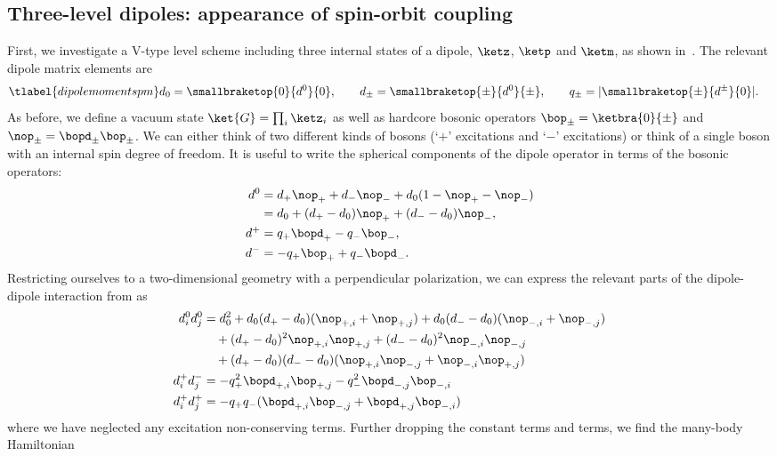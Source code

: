 \subsection{Three-level dipoles: appearance of spin-orbit coupling}
First, we investigate a \textsf{V}-type level scheme including three internal states of a dipole, $\ketz$, $\ketp$ and $\ketm$, as shown in~. The relevant dipole matrix elements are
\begin{align} \tlabel{dipolemomentspm}
    d_0 = \smallbraketop{0}{d^0}{0}, \qquad
    d_\pm = \smallbraketop{\pm}{d^0}{\pm}, \qquad
    q_\pm &= |\smallbraketop{\pm}{d^\pm}{0}|.
\end{align}
As before, we define a vacuum state $\ket{G}=\prod_i \ketz_i$ as well as hardcore bosonic operators $\bop_\pm=\ketbra{0}{{\pm}}$ and $\nop_{\pm}=\bopd_{\pm}\bop_{\pm}$. We can either think of two different kinds of bosons (`$+$' excitations and `$-$' excitations) or think of a single boson with an internal spin degree of freedom. It is useful to write the spherical components of the dipole operator in terms of the bosonic operators:
\begin{align}
    d^0 &= d_+ \nop_+ + d_- \nop_- + d_0 (1-\nop_+-\nop_-) \\
        &= d_0 + (d_+-d_0) \nop_+ + (d_--d_0) \nop_-, \\
    d^+ &= q_+ \bopd_+ - q_- \bop_-, \\
    d^- &= - q_+ \bop_+  + q_- \bopd_-.
\end{align}
Restricting ourselves to a two-dimensional geometry with a perpendicular polarization, we can express the relevant parts of the dipole-dipole interaction from  as
\begin{align}
    d^0_i d^0_j &= d_0^2 + d_0(d_+-d_0) (\nop_{+,i}+\nop_{+,j}) + d_0(d_--d_0) (\nop_{-,i}+\nop_{-,j}) \\
                &\quad + (d_+ - d_0)^2 \nop_{+,i} \nop_{+,j} + (d_- - d_0)^2 \nop_{-,i} \nop_{-,j} \\
                &\quad + (d_+ - d_0)(d_- - d_0) (\nop_{+,i} \nop_{-,j} + \nop_{-,i} \nop_{+,j}) \\
    d^+_i d^-_j &= - q_+^2 \bopd_{+,i} \bop_{+,j} - q_-^2 \bopd_{-,j} \bop_{-,i} \\
    d^+_i d^+_j &= - q_+q_- (\bopd_{+,i} \bop_{-,j} + \bopd_{+,j} \bop_{-,i})
\end{align}
where we have neglected any excitation non-conserving terms. Further dropping the constant terms and  terms, we find the many-body Hamiltonian
